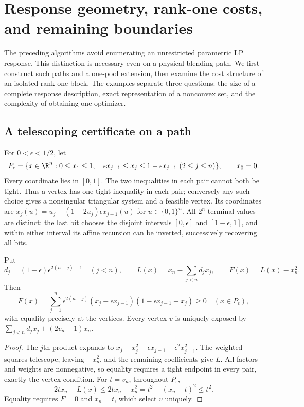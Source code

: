 \section{Response geometry, rank-one costs, and remaining boundaries}\label{s6:synthesis}

The preceding algorithms avoid enumerating an unrestricted parametric LP
response. This distinction is necessary even on a physical blending path.
We first construct such paths and a one-pool extension, then examine the
cost structure of an isolated rank-one block. The examples separate three
questions: the size of a complete response description, exact representation
of a nonconvex set, and the complexity of obtaining one optimizer.

\subsection{A telescoping certificate on a path}\label{s6:telescoping}
For $0<\epsilon<1/2$, let
\begin{equation}
 P_\epsilon=\{x\in\R^n:0\le x_1\le1,\quad
 \epsilon x_{j-1}\le x_j\le1-\epsilon x_{j-1}\ (2\le j\le n)\},
 \qquad x_0=0.\label{s6:km}
\end{equation}
Every coordinate lies in $[0,1]$. The two inequalities in each pair
cannot both be tight. Thus a vertex has one tight inequality in each
pair; conversely any such choice gives a nonsingular triangular system
and a feasible vertex. Its coordinates are
$x_j(u)=u_j+(1-2u_j)\epsilon x_{j-1}(u)$ for $u\in\{0,1\}^n$.
All $2^n$ terminal values are distinct: the last bit chooses the disjoint
intervals $[0,\epsilon]$ and $[1-\epsilon,1]$, and within either interval
its affine recursion can be inverted, successively recovering all bits.

\begin{lemma}\label{s6:certificate}
Put
\[
 d_j=(1-\epsilon)\epsilon^{2(n-j)-1}\quad(j<n),\qquad
 L(x)=x_n-\sum_{j<n}d_jx_j,\qquad F(x)=L(x)-x_n^2.
\]
Then
\begin{equation}
 F(x)=\sum_{j=1}^n\epsilon^{2(n-j)}
 (x_j-\epsilon x_{j-1})(1-\epsilon x_{j-1}-x_j)\ge0
 \quad(x\in P_\epsilon),\label{s6:telescoping-identity}
\end{equation}
with equality precisely at the vertices. Every vertex $v$ is uniquely
exposed by $\sum_{j<n}d_jx_j+(2v_n-1)x_n$.
\end{lemma}
\begin{proof}
The $j$th product expands to
$x_j-x_j^2-\epsilon x_{j-1}+\epsilon^2x_{j-1}^2$.
The weighted squares telescope, leaving $-x_n^2$, and the remaining
coefficients give $L$. All factors and weights are nonnegative, so equality
requires a tight endpoint in every pair, exactly the vertex condition.
For $t=v_n$, throughout $P_\epsilon$,
\[
 2tx_n-L(x)\le 2tx_n-x_n^2=t^2-(x_n-t)^2\le t^2.
\]
Equality requires $F=0$ and $x_n=t$, which select $v$ uniquely.
\end{proof}

